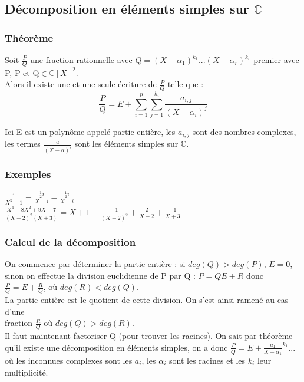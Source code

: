 \documentclass[a4paper,10pt]{book} %
\newcommand{\C}{\mathbb{C}}
\begin{document}
\subsection{Décomposition en éléments simples sur $\C$}
\subsubsection{Théorème}
Soit $\frac{P}{Q}$ une fraction rationnelle avec $Q=(X-\alpha_{1})^{k_{1}}...(X-\alpha_{r})^{k_{r}}$ premier avec P, P et Q$\in \C[X]^{2}$.\\

Alors il existe une et une seule écriture de $\frac{P}{Q}$ telle que :\\
$$\frac{P}{Q}=E+\sum\limits_{i=1}^p\sum\limits_{j=1}^{k_i}
\frac{a_{i,j}}{(X-\alpha_i)^j}$$

Ici E est un polynôme appelé partie entière, les $a_{i,j}$ sont des nombres complexes, les termes $\frac{a}{(X-\alpha)^{i}}$ sont les éléments simples sur $\C$.

\subsubsection{Exemples}
$\frac{1}{X^{2}+1}=\frac{\frac{1}{2}i}{X-i}-\frac{\frac{1}{2}i}{X+i}$\\

$\frac{X^{4}-8X^{2}+9X-7}{(X-2)^{2}(X+3)}=X+1+\frac{-1}{(X-2)^{2}}+\frac{2}{X-2}+\frac{-1}{X+3}$

\subsubsection{Calcul de la décomposition}
On commence par déterminer la partie entière : si $deg(Q)>deg(P)$, $E=0$, sinon on effectue la division euclidienne de P par Q :
$P=QE+R$ donc $\frac{P}{Q}=E+\frac{R}{Q}$, où $deg(R)<deg(Q)$.\\

La partie entière est le quotient de cette division. On s'est ainsi ramené au cas d'une\\
fraction $\frac{R}{Q}$ où $deg(Q)>deg(R)$.\\

Il faut maintenant factoriser Q (pour trouver les racines). On sait par théorème qu'il existe une décomposition en éléments simples, on a donc $\frac{P}{Q}=E+\frac{a_{1}}{X-\alpha_{1}}^{k_{1}}...$ où les inconnues complexes sont les $a_{i}$, les $\alpha_{i}$ sont les racines et les $k_{i}$ leur multiplicité.\\\\
\end{document}
